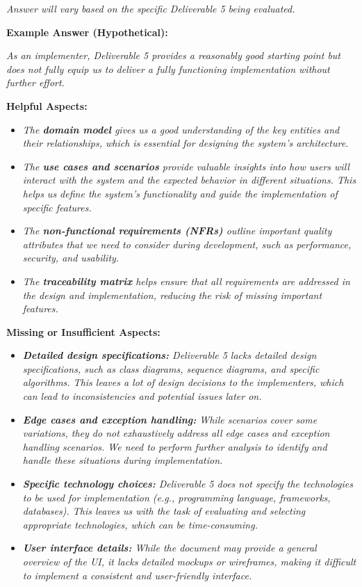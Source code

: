 \documentclass{article}
\begin{document}
\textit{Answer will vary based on the specific Deliverable 5 being evaluated.}

\textbf{Example Answer (Hypothetical):}

\textit{As an implementer, Deliverable 5 provides a reasonably good starting point but does not fully equip us to deliver a fully functioning implementation without further effort.}

\textbf{Helpful Aspects:}

\begin{itemize}
    \item \textit{The \textbf{domain model} gives us a good understanding of the key entities and their relationships, which is essential for designing the system's architecture.}
    \item \textit{The \textbf{use cases and scenarios} provide valuable insights into how users will interact with the system and the expected behavior in different situations. This helps us define the system's functionality and guide the implementation of specific features.}
    \item \textit{The \textbf{non-functional requirements (NFRs)} outline important quality attributes that we need to consider during development, such as performance, security, and usability.}
    \item \textit{The \textbf{traceability matrix} helps ensure that all requirements are addressed in the design and implementation, reducing the risk of missing important features.}
\end{itemize}

\textbf{Missing or Insufficient Aspects:}

\begin{itemize}
    \item \textit{\textbf{Detailed design specifications:} Deliverable 5 lacks detailed design specifications, such as class diagrams, sequence diagrams, and specific algorithms. This leaves a lot of design decisions to the implementers, which can lead to inconsistencies and potential issues later on.}
    \item \textit{\textbf{Edge cases and exception handling:} While scenarios cover some variations, they do not exhaustively address all edge cases and exception handling scenarios. We need to perform further analysis to identify and handle these situations during implementation.}
    \item \textit{\textbf{Specific technology choices:} Deliverable 5 does not specify the technologies to be used for implementation (e.g., programming language, frameworks, databases). This leaves us with the task of evaluating and selecting appropriate technologies, which can be time-consuming.}
    \item \textit{\textbf{User interface details:} While the document may provide a general overview of the UI, it lacks detailed mockups or wireframes, making it difficult to implement a consistent and user-friendly interface.}
\end{itemize}
\end{document}
